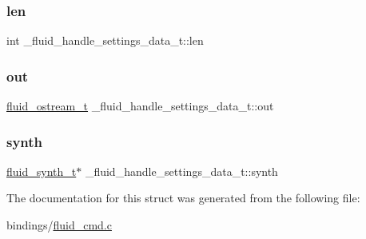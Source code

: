 \subsubsection{\texorpdfstring{len}{len}}
{\footnotesize\ttfamily int \+\_\+fluid\+\_\+handle\+\_\+settings\+\_\+data\+\_\+t\+::len}

\mbox{\label{struct__fluid__handle__settings__data__t_aba6fc20a71b263199ba78d30cbec30a0}} 
\subsubsection{\texorpdfstring{out}{out}}
{\footnotesize\ttfamily \hyperlink{types_8h_a6d8c441b84ab0430e358438cee876c69}{fluid\+\_\+ostream\+\_\+t} \+\_\+fluid\+\_\+handle\+\_\+settings\+\_\+data\+\_\+t\+::out}

\mbox{\label{struct__fluid__handle__settings__data__t_a0c301cc2b5d78e9725c490e5675b6212}} 
\subsubsection{\texorpdfstring{synth}{synth}}
{\footnotesize\ttfamily \hyperlink{types_8h_ae265f10ae174a13afe010de50d87e1a4}{fluid\+\_\+synth\+\_\+t}$\ast$ \+\_\+fluid\+\_\+handle\+\_\+settings\+\_\+data\+\_\+t\+::synth}



The documentation for this struct was generated from the following file\+:\begin{DoxyCompactItemize}
\item 
bindings/\hyperlink{fluid__cmd_8c}{fluid\+\_\+cmd.\+c}\end{DoxyCompactItemize}
